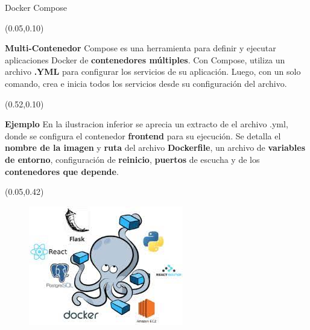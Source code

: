 \documentclass[xcolor=pdftex,dvipsnames,table]{beamer}
\begin{document}
\begin{frame}{Docker Compose}
\footnotesize

    \begin{textblock*}{0.4\textwidth}(0.05\textwidth,0.10\textwidth)  
            \begin{block}{\textbf{Multi-Contenedor}} 
                                            \justifying
                Compose es una herramienta para definir y ejecutar aplicaciones Docker de \textbf{contenedores múltiples}. Con Compose, utiliza un archivo \textbf{.YML} para configurar los servicios de su aplicación. Luego, con un solo comando, crea e inicia todos los servicios desde su configuración del archivo.
            \end{block} 
    \end{textblock*}
    
    \begin{textblock*}{0.48\textwidth}(0.52\textwidth,0.10\textwidth)  
            \begin{block}{\textbf{Ejemplo}} 
                                \justifying
                En la ilustracion inferior se aprecia un extracto de el archivo .yml, donde se configura el contenedor \textbf{frontend} para su ejecución. Se detalla el \textbf{nombre de la imagen} y \textbf{ruta} del archivo \textbf{Dockerfile}, un archivo de \textbf{variables de entorno}, configuración de \textbf{reinicio}, \textbf{puertos} de escucha y de los \textbf{contenedores que depende}.
            \end{block}  
    \end{textblock*}

    \begin{textblock*}{0.48\textwidth}(0.05\textwidth,0.42\textwidth)  
                    \begin{figure}
                        \centering
                        \includegraphics[width=0.8\linewidth]{implementacion/composeall.jpg}
                        \label{fig:my_label}
                    \end{figure}
    \end{textblock*}
    

\end{frame}
\end{document}
